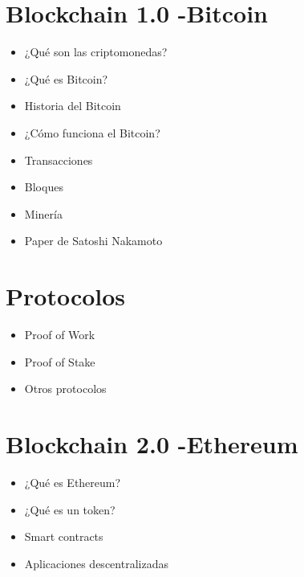 \documentclass{/home/armando/Documentos/Cursos/LaTeX/Plantillas/lib/temarioptc}
\begin{document}
\section{Blockchain 1.0 -Bitcoin}
\begin{itemize}
	\item ¿Qué son las criptomonedas?
	\item ¿Qué es Bitcoin?
	\item Historia del Bitcoin
	\item ¿Cómo funciona el Bitcoin?
	\item Transacciones
	\item Bloques
	\item Minería
	\item Paper de Satoshi Nakamoto
\end{itemize}
\section{Protocolos}
\begin{itemize}
	\item Proof of Work
	\item Proof of Stake
	\item Otros protocolos
\end{itemize}
\section{Blockchain 2.0 -Ethereum}
\begin{itemize}
	\item ¿Qué es Ethereum?
	\item ¿Qué es un token?
	\item Smart contracts
	\item Aplicaciones descentralizadas
\end{itemize}
\end{document}
